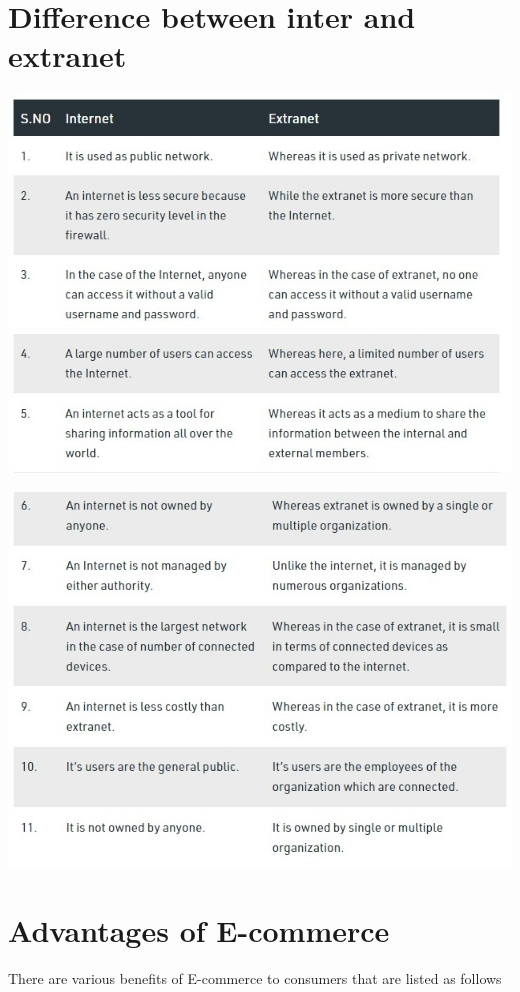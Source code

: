 \documentclass[a4paper]{article}
\begin{document}
\section{Difference between inter and extranet}
\includegraphics[scale=0.7]{diffinterextra}

\includegraphics[scale=0.69]{diffinterextra2}

\section{Advantages of E-commerce}
There are various benefits of E-commerce to consumers that are listed as
follows
\end{document}
